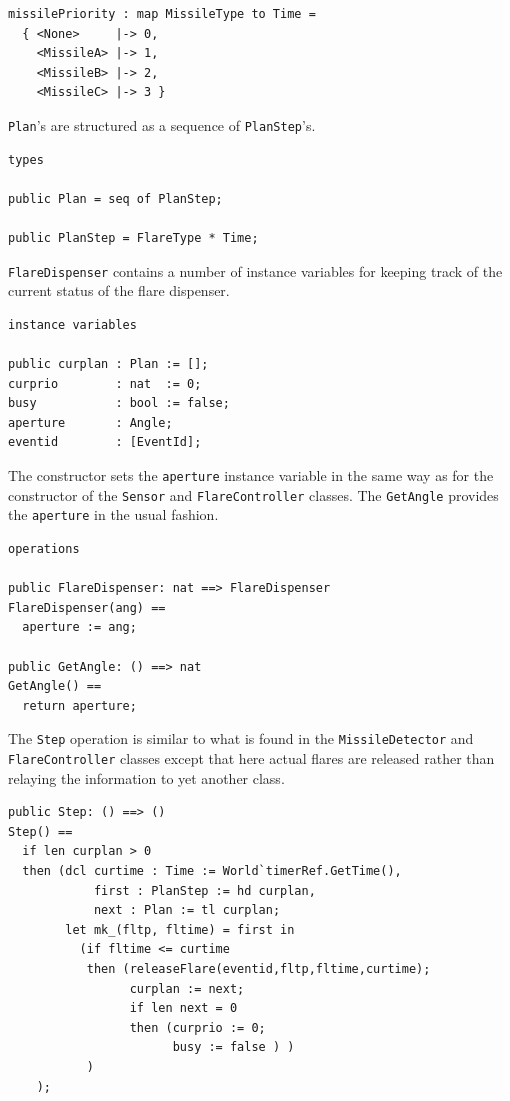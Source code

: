 \documentclass{overturerepchap}
\begin{document}
\begin{lstlisting}
missilePriority : map MissileType to Time =
  { <None>     |-> 0,
    <MissileA> |-> 1,
    <MissileB> |-> 2,
    <MissileC> |-> 3 }
\end{lstlisting}

\texttt{Plan}'s are structured as a sequence of \texttt{PlanStep}'s.

\begin{lstlisting}
types

public Plan = seq of PlanStep;

public PlanStep = FlareType * Time;
\end{lstlisting}

\texttt{FlareDispenser} contains a number of instance variables for 
keeping track of the current status of the flare dispenser.

\begin{lstlisting}
instance variables

public curplan : Plan := [];
curprio        : nat  := 0;
busy           : bool := false;
aperture       : Angle;
eventid        : [EventId];
\end{lstlisting}

The constructor sets the \texttt{aperture} instance variable in the 
same way as for the constructor of the \texttt{Sensor} and
\texttt{FlareController} classes. The \texttt{GetAngle} provides the 
\texttt{aperture} in the usual fashion.

\begin{lstlisting}
operations

public FlareDispenser: nat ==> FlareDispenser
FlareDispenser(ang) ==
  aperture := ang;

public GetAngle: () ==> nat
GetAngle() ==
  return aperture;
\end{lstlisting}

The \texttt{Step} operation is similar to what is found in the 
\texttt{MissileDetector} and \texttt{FlareController} classes except that 
here actual flares are released rather than relaying the information to
yet another class.

\begin{lstlisting}
public Step: () ==> ()
Step() ==
  if len curplan > 0
  then (dcl curtime : Time := World`timerRef.GetTime(),
            first : PlanStep := hd curplan,
            next : Plan := tl curplan;
        let mk_(fltp, fltime) = first in
          (if fltime <= curtime
           then (releaseFlare(eventid,fltp,fltime,curtime);
                 curplan := next;
                 if len next = 0
                 then (curprio := 0; 
                       busy := false ) )
           )
    );
\end{lstlisting}
\end{document}
